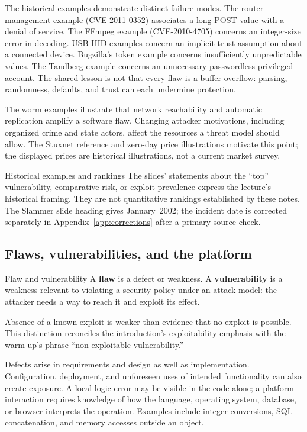 \documentclass[11pt,a4paper]{article}
\numberwithin{figure}{section}
\begin{document}
The historical examples demonstrate distinct failure modes. The router-management example (CVE-2011-0352) associates a long POST value with a denial of service. The FFmpeg example (CVE-2010-4705) concerns an integer-size error in decoding. USB HID examples concern an implicit trust assumption about a connected device. Bugzilla's token example concerns insufficiently unpredictable values. The Tandberg example concerns an unnecessary passwordless privileged account. The shared lesson is not that every flaw is a buffer overflow: parsing, randomness, defaults, and trust can each undermine protection.

The worm examples illustrate that network reachability and automatic replication amplify a software flaw. Changing attacker motivations, including organized crime and state actors, affect the resources a threat model should allow. The Stuxnet reference and zero-day price illustrations motivate this point; the displayed prices are historical illustrations, not a current market survey.

\begin{technical}{Historical examples and rankings}
The slides' statements about the ``top'' vulnerability, comparative risk, or exploit prevalence express the lecture's historical framing. They are not quantitative rankings established by these notes. The Slammer slide heading gives January~2002; the incident date is corrected separately in Appendix~\ref{app:corrections} after a primary-source check.
\end{technical}

\subsection{Flaws, vulnerabilities, and the platform}
\begin{definition}{Flaw and vulnerability}
A \textbf{flaw} is a defect or weakness. A \textbf{vulnerability} is a weakness relevant to violating a security policy under an attack model: the attacker needs a way to reach it and exploit its effect.
\end{definition}
Absence of a known exploit is weaker than evidence that no exploit is possible. This distinction reconciles the introduction's exploitability emphasis with the warm-up's phrase ``non-exploitable vulnerability.''

Defects arise in requirements and design as well as implementation. Configuration, deployment, and unforeseen uses of intended functionality can also create exposure. A local logic error may be visible in the code alone; a platform interaction requires knowledge of how the language, operating system, database, or browser interprets the operation. Examples include integer conversions, SQL concatenation, and memory accesses outside an object.
\end{document}
